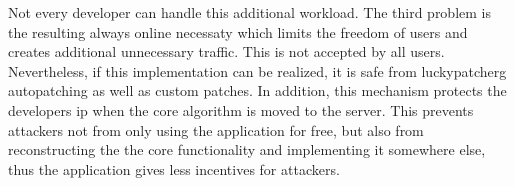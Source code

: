Not every developer can handle this additional workload.
The third problem is the resulting always online necessaty which limits the freedom of users and creates additional unnecessary traffic.
This is not accepted by all users.
\newline
Nevertheless, if this implementation can be realized, it is safe from \gls{luckypatcherg} autopatching as well as custom patches.
In addition, this mechanism protects the developers \gls{ip} when the core algorithm is moved to the server.
This prevents attackers not from only using the application for free, but also from reconstructing the the core functionality and implementing it somewhere else, thus the application gives less incentives for attackers.
